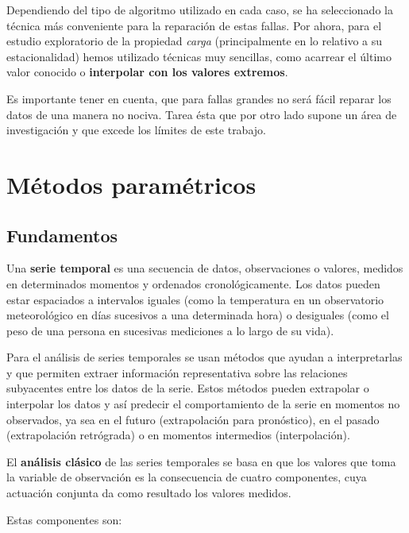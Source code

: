 \documentclass[]{book}
\begin{document}
Dependiendo del tipo de algoritmo utilizado en cada caso, se ha
seleccionado la técnica más conveniente para la reparación de estas
fallas. Por ahora, para el estudio exploratorio de la propiedad
\emph{carga} (principalmente en lo relativo a su estacionalidad) hemos
utilizado técnicas muy sencillas, como acarrear el último valor conocido
o \textbf{interpolar con los valores extremos}.

Es importante tener en cuenta, que para fallas grandes no será fácil
reparar los datos de una manera no nociva. Tarea ésta que por otro lado
supone un área de investigación y que excede los límites de este
trabajo.

\chapter{Métodos paramétricos}\label{metodos-parametricos}

\section{Fundamentos}\label{fundamentos}

Una \textbf{serie temporal} es una secuencia de datos, observaciones o
valores, medidos en determinados momentos y ordenados cronológicamente.
Los datos pueden estar espaciados a intervalos iguales (como la
temperatura en un observatorio meteorológico en días sucesivos a una
determinada hora) o desiguales (como el peso de una persona en sucesivas
mediciones a lo largo de su vida).

Para el análisis de series temporales se usan métodos que ayudan a
interpretarlas y que permiten extraer información representativa sobre
las relaciones subyacentes entre los datos de la serie. Estos métodos
pueden extrapolar o interpolar los datos y así predecir el
comportamiento de la serie en momentos no observados, ya sea en el
futuro (extrapolación para pronóstico), en el pasado (extrapolación
retrógrada) o en momentos intermedios (interpolación).

El \textbf{análisis clásico} de las series temporales se basa en que los
valores que toma la variable de observación es la consecuencia de cuatro
componentes, cuya actuación conjunta da como resultado los valores
medidos.

Estas componentes son:
\end{document}

